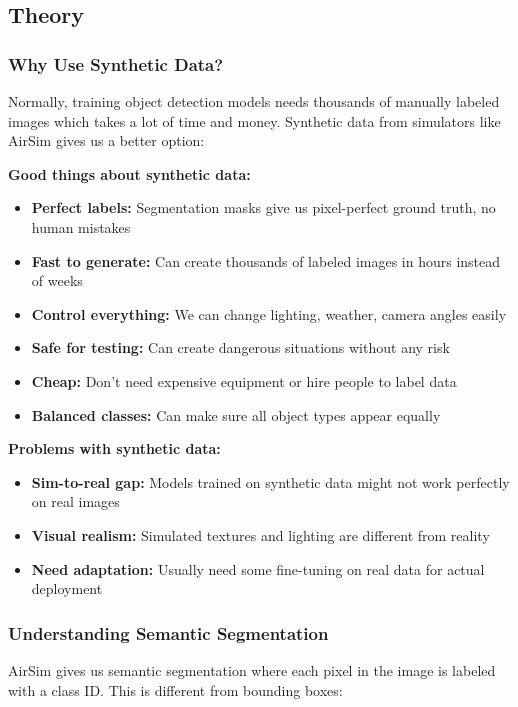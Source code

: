 \subsection{Theory}

\subsubsection{Why Use Synthetic Data?}

Normally, training object detection models needs thousands of manually labeled images which takes a lot of time and money. Synthetic data from simulators like AirSim gives us a better option:

\textbf{Good things about synthetic data:}
\begin{itemize}
	\item \textbf{Perfect labels:} Segmentation masks give us pixel-perfect ground truth, no human mistakes
	\item \textbf{Fast to generate:} Can create thousands of labeled images in hours instead of weeks
	\item \textbf{Control everything:} We can change lighting, weather, camera angles easily
	\item \textbf{Safe for testing:} Can create dangerous situations without any risk
	\item \textbf{Cheap:} Don't need expensive equipment or hire people to label data
	\item \textbf{Balanced classes:} Can make sure all object types appear equally
\end{itemize}

\textbf{Problems with synthetic data:}
\begin{itemize}
	\item \textbf{Sim-to-real gap:} Models trained on synthetic data might not work perfectly on real images
	\item \textbf{Visual realism:} Simulated textures and lighting are different from reality
	\item \textbf{Need adaptation:} Usually need some fine-tuning on real data for actual deployment
\end{itemize}

\subsubsection{Understanding Semantic Segmentation}

AirSim gives us semantic segmentation where each pixel in the image is labeled with a class ID. This is different from bounding boxes:

